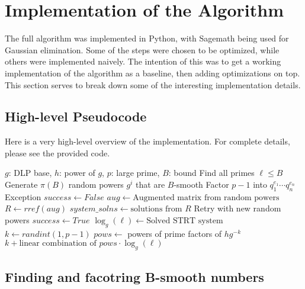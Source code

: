 \documentclass[]{math_paper}
\begin{document}
\section{Implementation of the Algorithm} \label{sec:csalg}
The full algorithm was implemented in Python, with Sagemath being used for Gaussian elimination. Some of the steps were chosen to be optimized, while others were implemented naively. The intention of this was to get a working implementation of the algorithm as a baseline, then adding optimizations on top. This section serves to break down some of the interesting implementation details.
\subsection{High-level Pseudocode} \label{subsec:pseudocode}
Here is a very high-level overview of the implementation. For complete details, please see the provided code.
\begin{algorithm}[H]
    \begin{algorithmic}[1]
        \Require $g$: DLP base, $h$: power of $g$, $p$: large prime, $B$: bound
        \State Find all primes $\ell \leq B$
        \State Generate $\pi(B)$ random powers $g^i$ that are $B$-smooth
        \State Factor $p-1$ into $q_1^{e_1} \cdots q_n^{e_n}$
        \State \Return Exception
        \EndIf
        \State $success \gets False$
        \State $aug \gets \text{Augmented matrix from random powers}$
        \State $R \gets rref(aug)$
        \State $system\_solns \gets \text{solutions from }R$
        \State Retry with new random powers
        \Else
        \State $success \gets True$
        \EndIf
        \EndWhile
        \State $\log_g(\ell) \gets \text{Solved STRT system}$
        \State $k \gets randint(1, p-1)$
        \State $pows \gets$ powers of prime factors of $hg^{-k}$
        \State \Return $k + \text{linear combination of $pows \cdot \log_g(\ell)$}$
        \EndIf
        \EndWhile
        \EndFunction
    \end{algorithmic}
\end{algorithm}
\subsection{Finding and facotring B-smooth numbers} \label{subsec:b-smooth}
\end{document}
